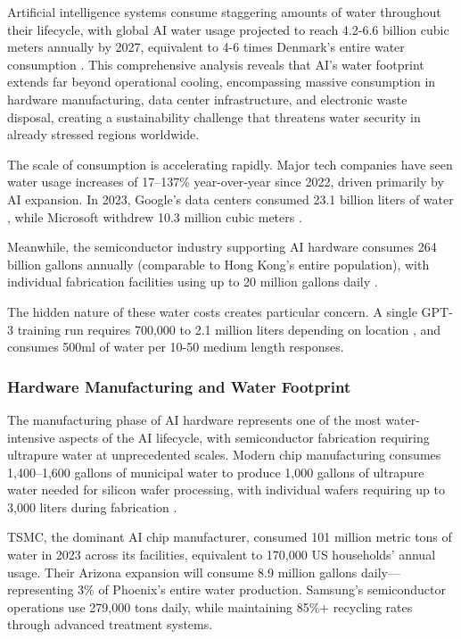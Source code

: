 \documentclass[twoside]{ai_ethics_class}
\begin{document}
Artificial intelligence systems consume staggering amounts of water throughout their lifecycle, with global AI water usage projected to reach 4.2-6.6 billion cubic meters annually by 2027, equivalent to 4-6 times Denmark's entire water consumption \cite{li2023making}.
This comprehensive analysis reveals that AI's water footprint extends far beyond operational cooling, encompassing massive consumption in hardware manufacturing, data center infrastructure, and electronic waste disposal, creating a sustainability challenge that threatens water security in already stressed regions worldwide.

The scale of consumption is accelerating rapidly.
Major tech companies have seen water usage increases of 17--137\% year-over-year since 2022, driven primarily by AI expansion.
In 2023, Google's data centers consumed 23.1 billion liters of water \cite{google2023environmental}, while Microsoft withdrew 10.3 million cubic meters \cite{microsoft2025environmental}.

Meanwhile, the semiconductor industry supporting AI hardware consumes 264 billion gallons annually (comparable to Hong Kong's entire population), with individual fabrication facilities using up to 20 million gallons daily \cite{frost2019quantifying}.

The hidden nature of these water costs creates particular concern.
A single GPT-3 training run requires 700,000 to 2.1 million liters depending on location \cite{li2023making}, and consumes 500ml of water per 10-50 medium length responses.

\subsubsection{Hardware Manufacturing and Water Footprint}

The manufacturing phase of AI hardware represents one of the most water-intensive aspects of the AI lifecycle, with semiconductor fabrication requiring ultrapure water at unprecedented scales.
Modern chip manufacturing consumes 1,400--1,600 gallons of municipal water to produce 1,000 gallons of ultrapure water needed for silicon wafer processing, with individual wafers requiring up to 3,000 liters during fabrication \cite{industrytoday2022water}.

TSMC, the dominant AI chip manufacturer, consumed 101 million metric tons of water in 2023 \cite{statista2023tsmcwater} across its facilities, equivalent to 170,000 US households' annual usage.
Their Arizona expansion will consume 8.9 million gallons daily---representing 3\% of Phoenix's entire water production.
Samsung's semiconductor operations \cite{samsung2023water} use 279,000 tons daily, while maintaining 85\%+ recycling rates through advanced treatment systems.
\end{document}
